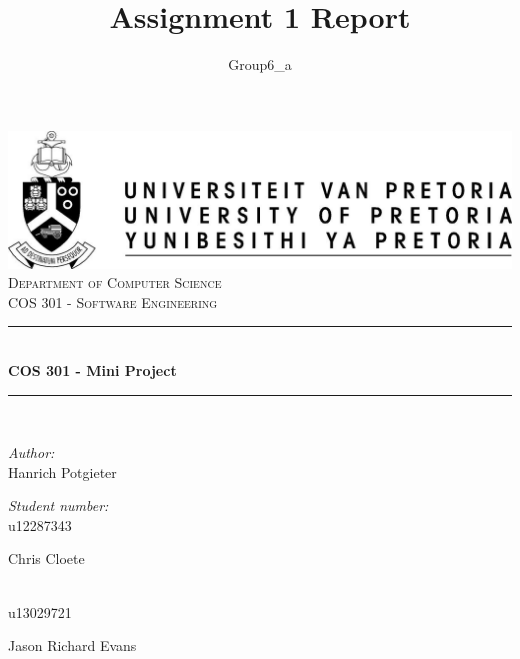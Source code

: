 \documentclass[a4paper,12pt]{report}
\author{Group6_a}
\title{ Assignment 1 Report}
\newcommand{\HRule}{\rule{\linewidth}{0.5mm}}
\begin{document}
\setlength{\parskip}{6pt}

\begin{titlepage}

\begin{center}
\includegraphics[width=1\textwidth]{./up-logo.jpg}\\[0.4cm]    
\textsc{\LARGE Department of Computer Science}\\[1.5cm]
\textsc{\Large COS 301 - Software Engineering}\\[0.5cm]
\HRule \\[0.4cm]
{ \huge \bfseries COS 301 - Mini Project}\\[0.4cm]
\HRule \\[0.4cm]
\begin{minipage}{0.4\textwidth}
\begin{flushleft} \large
\emph{Author:}\\
Hanrich {Potgieter}
\end{flushleft}
\end{minipage}
\begin{minipage}{0.4\textwidth}
\begin{flushright} \large
\emph{Student number:} \\
u12287343
\end{flushright}
\end{minipage}
\begin{minipage}{0.4\textwidth}
\begin{flushleft} \large
Chris {Cloete}
\end{flushleft}
\end{minipage}
\begin{minipage}{0.4\textwidth}
\begin{flushright} \large
\emph{} \\
u13029721
\end{flushright}
\end{minipage}
\begin{minipage}{0.4\textwidth}
\begin{flushleft} \large
Jason Richard {Evans}
\end{flushleft}

\end{minipage}
\end{center}
\end{titlepage}
\end{document}
